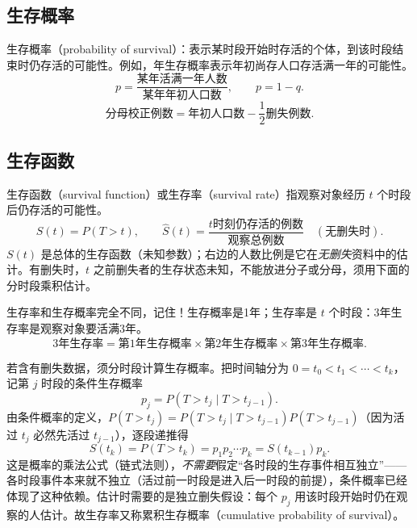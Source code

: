 \subsection{生存概率}
生存概率（probability of survival）：表示某时段开始时存活的个体，到该时段结束时仍存活的可能性。例如，年生存概率表示年初尚存人口存活满一年的可能性。
\[
p=\frac{\text{某年活满一年人数}}{\text{某年年初人口数}},\qquad p=1-q.
\]
\[
\text{分母校正例数}=\text{年初人口数}-\frac12\text{删失例数}.
\]
\subsection{生存函数}
生存函数（survival function）或生存率（survival rate）指观察对象经历 $t$ 个时段后仍存活的可能性。
\[
S(t)=P(T>t),\qquad
\widehat S(t)=\frac{t\text{时刻仍存活的例数}}{\text{观察总例数}}\quad(\text{无删失时}).
\]
$S(t)$ 是总体的生存函数（未知参数）；右边的人数比例是它在\emph{无删失}资料中的估计。有删失时，$t$ 之前删失者的生存状态未知，不能放进分子或分母，须用下面的分时段乘积估计。
\begin{annotation}
生存率和生存概率完全不同，记住！生存概率是1年；生存率是 $t$ 个时段：3年生存率是观察对象要活满3年。
\[
\text{3年生存率}=\text{第1年生存概率}\times\text{第2年生存概率}\times\text{第3年生存概率}.
\]
\end{annotation}
若含有删失数据，须分时段计算生存概率。把时间轴分为 $0=t_0<t_1<\cdots<t_k$，记第 $j$ 时段的条件生存概率
\[
p_j=P(T>t_j\mid T>t_{j-1}).
\]
由条件概率的定义，$P(T>t_j)=P(T>t_j\mid T>t_{j-1})P(T>t_{j-1})$（因为活过 $t_j$ 必然先活过 $t_{j-1}$），逐段递推得
\[
S(t_k)=P(T>t_k)=p_1p_2\cdots p_k=S(t_{k-1})p_k.
\]
这是概率的乘法公式（链式法则），\emph{不需要}假定“各时段的生存事件相互独立”——各时段事件本来就不独立（活过前一时段是进入后一时段的前提），条件概率已经体现了这种依赖。估计时需要的是独立删失假设：每个 $p_j$ 用该时段开始时仍在观察的人估计。故生存率又称累积生存概率（cumulative probability of survival）。
